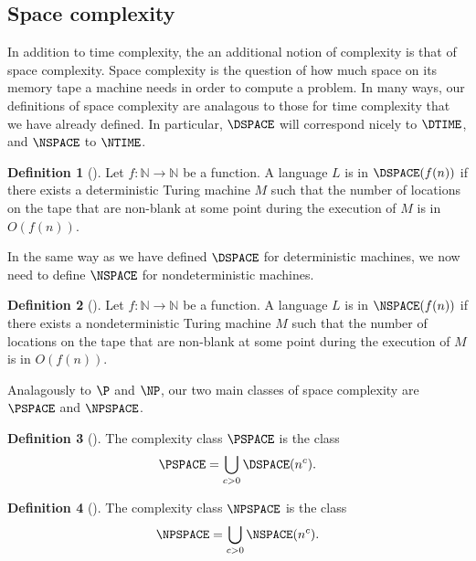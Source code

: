 \documentclass[english,12pt]{reedthesis}
\theoremstyle{plain}
\theoremstyle{definition}
\newtheorem{defn}[defn]{Definition}
\theoremstyle{remark}
\begin{document}
\subsection{Space complexity}

In addition to time complexity, the an additional notion of complexity is that
of space complexity. Space complexity is the question of how much space on its
memory tape a machine needs in order to compute a problem. In many ways, our
definitions of space complexity are analagous to those for time complexity that
we have already defined. In particular, $\DSPACE$ will correspond nicely to
$\DTIME$, and $\NSPACE$ to $\NTIME$.

\begin{defn}[{\cite[Def.\ 4.1]{AB09}}]\label{def:dspace}
  Let $f\colon \mathbb{N} \rightarrow \mathbb{N}$ be a function. A language $L$ is in $\DSPACE(f(n))$ if
  there exists a deterministic Turing machine $M$ such that the number of
  locations on the tape that are non-blank at some point during the execution of
  $M$ is in $O(f(n))$.
\end{defn}

In the same way as we have defined $\DSPACE$ for deterministic machines, we now
need to define $\NSPACE$ for nondeterministic machines.

\begin{defn}[{\cite[Def. 4.1]{AB09}}]\label{def:nspace}
  Let $f\colon \mathbb{N} \rightarrow \mathbb{N}$ be a function. A language $L$ is in $\NSPACE(f(n))$ if there
  exists a nondeterministic Turing machine $M$ such that the number of locations
  on the tape that are non-blank at some point during the execution of $M$ is in
  $O(f(n))$.
\end{defn}

Analagously to $\P$ and $\NP$, our two main classes of space complexity are
$\PSPACE$ and $\NPSPACE$.

\begin{defn}[{\cite[Def.\ 4.5]{AB09}}]\label{def:pspace}
  The complexity class $\PSPACE$ is the class
  \[
    \PSPACE = \bigcup_{c > 0}\DSPACE(n^{c}).
  \]
\end{defn}

\begin{defn}[{\cite[Def.\ 4.5]{AB09}}]\label{def:npspace}
  The complexity class $\NPSPACE$ is the class
  \[
    \NPSPACE = \bigcup_{c > 0}\NSPACE(n^{c}).
  \]
\end{defn}
\end{document}
